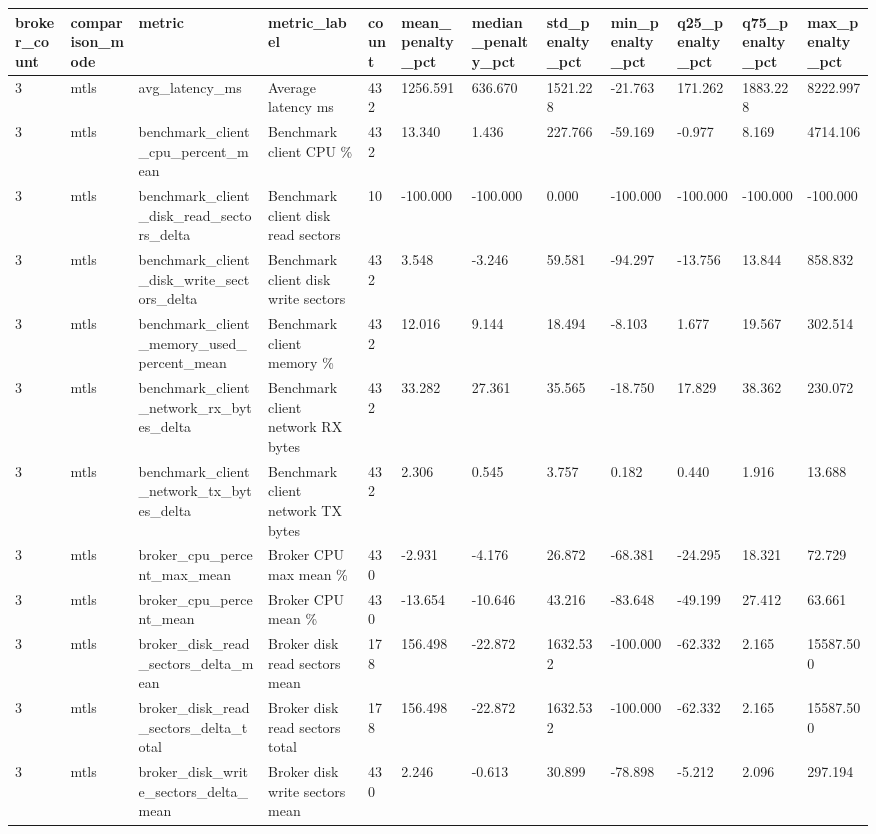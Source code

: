 \begin{longtable}{llllllllllll}
\hline
broker\_count & comparison\_mode & metric & metric\_label & count & mean\_penalty\_pct & median\_penalty\_pct & std\_penalty\_pct & min\_penalty\_pct & q25\_penalty\_pct & q75\_penalty\_pct & max\_penalty\_pct \\
\hline
3 & mtls & avg\_latency\_ms & Average latency ms & 432 & 1256.591 & 636.670 & 1521.228 & -21.763 & 171.262 & 1883.228 & 8222.997 \\
3 & mtls & benchmark\_client\_cpu\_percent\_mean & Benchmark client CPU \% & 432 & 13.340 & 1.436 & 227.766 & -59.169 & -0.977 & 8.169 & 4714.106 \\
3 & mtls & benchmark\_client\_disk\_read\_sectors\_delta & Benchmark client disk read sectors & 10 & -100.000 & -100.000 & 0.000 & -100.000 & -100.000 & -100.000 & -100.000 \\
3 & mtls & benchmark\_client\_disk\_write\_sectors\_delta & Benchmark client disk write sectors & 432 & 3.548 & -3.246 & 59.581 & -94.297 & -13.756 & 13.844 & 858.832 \\
3 & mtls & benchmark\_client\_memory\_used\_percent\_mean & Benchmark client memory \% & 432 & 12.016 & 9.144 & 18.494 & -8.103 & 1.677 & 19.567 & 302.514 \\
3 & mtls & benchmark\_client\_network\_rx\_bytes\_delta & Benchmark client network RX bytes & 432 & 33.282 & 27.361 & 35.565 & -18.750 & 17.829 & 38.362 & 230.072 \\
3 & mtls & benchmark\_client\_network\_tx\_bytes\_delta & Benchmark client network TX bytes & 432 & 2.306 & 0.545 & 3.757 & 0.182 & 0.440 & 1.916 & 13.688 \\
3 & mtls & broker\_cpu\_percent\_max\_mean & Broker CPU max mean \% & 430 & -2.931 & -4.176 & 26.872 & -68.381 & -24.295 & 18.321 & 72.729 \\
3 & mtls & broker\_cpu\_percent\_mean & Broker CPU mean \% & 430 & -13.654 & -10.646 & 43.216 & -83.648 & -49.199 & 27.412 & 63.661 \\
3 & mtls & broker\_disk\_read\_sectors\_delta\_mean & Broker disk read sectors mean & 178 & 156.498 & -22.872 & 1632.532 & -100.000 & -62.332 & 2.165 & 15587.500 \\
3 & mtls & broker\_disk\_read\_sectors\_delta\_total & Broker disk read sectors total & 178 & 156.498 & -22.872 & 1632.532 & -100.000 & -62.332 & 2.165 & 15587.500 \\
3 & mtls & broker\_disk\_write\_sectors\_delta\_mean & Broker disk write sectors mean & 430 & 2.246 & -0.613 & 30.899 & -78.898 & -5.212 & 2.096 & 297.194 \\

\end{longtable}
